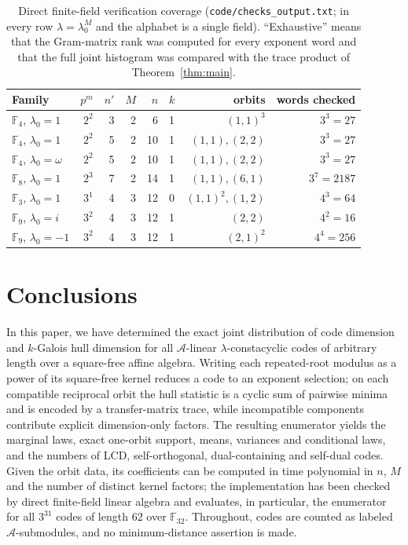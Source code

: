 \documentclass[11pt,a4paper]{article}
\newcommand{\F}{\mathbb F}
\newcommand{\A}{\mathcal A}
\numberwithin{equation}{section}
\theoremstyle{plain}
\theoremstyle{definition}
\theoremstyle{remark}
\begin{document}
\begin{table}[htbp]
\centering
\small
\setlength{\tabcolsep}{4pt}
\caption{Direct finite-field verification coverage
(\texttt{code/checks\_output.txt}; in every row $\lambda=\lambda_0^M$ and the
alphabet is a single field).  ``Exhaustive'' means that the Gram-matrix rank
was computed for every exponent word and that the full joint histogram was
compared with the trace product of Theorem~\ref{thm:main}.}
\label{tab:verification}
\begin{tabular}{lrrrrlrr}
\toprule
Family & $p^m$ & $n'$ & $M$ & $n$ & $k$ & orbits & words checked\\
\midrule
$\F_4$, $\lambda_0=1$ & $2^2$ & 3 & 2 & 6  & 1 & $(1,1)^3$          & $3^3=27$\\
$\F_4$, $\lambda_0=1$ & $2^2$ & 5 & 2 & 10 & 1 & $(1,1),(2,2)$      & $3^3=27$\\
$\F_4$, $\lambda_0=\omega$ & $2^2$ & 5 & 2 & 10 & 1 & $(1,1),(2,2)$ & $3^3=27$\\
$\F_8$, $\lambda_0=1$ & $2^3$ & 7 & 2 & 14 & 1 & $(1,1),(6,1)$      & $3^7=2187$\\
$\F_3$, $\lambda_0=1$ & $3^1$ & 4 & 3 & 12 & 0 & $(1,1)^2,(1,2)$    & $4^3=64$\\
$\F_9$, $\lambda_0=i$ & $3^2$ & 4 & 3 & 12 & 1 & $(2,2)$            & $4^2=16$\\
$\F_9$, $\lambda_0=-1$ & $3^2$ & 4 & 3 & 12 & 1 & $(2,1)^2$         & $4^4=256$\\
\bottomrule
\end{tabular}
\end{table}

\section{Conclusions}\label{sec:conclusions}
In this paper, we have determined the exact joint distribution of code dimension and
$k$-Galois hull dimension for all $\A$-linear $\lambda$-constacyclic codes
of arbitrary length over a square-free affine algebra. Writing each
repeated-root modulus as a power of its square-free kernel reduces a code to
an exponent selection; on each compatible reciprocal orbit the hull statistic
is a cyclic sum of pairwise minima and is encoded by a transfer-matrix trace,
while incompatible components contribute explicit dimension-only factors. The
resulting enumerator yields the marginal laws, exact one-orbit support,
means, variances and conditional laws, and the numbers of LCD,
self-orthogonal, dual-containing and self-dual codes. Given the orbit data,
its coefficients can be computed in time polynomial in $n$, $M$ and the
number of distinct kernel factors; the implementation has been checked by
direct finite-field linear algebra and evaluates, in particular, the
enumerator for all $3^{31}$ codes of length $62$ over $\F_{32}$. Throughout,
codes are counted as labeled $\A$-submodules, and no minimum-distance
assertion is made.
\end{document}
